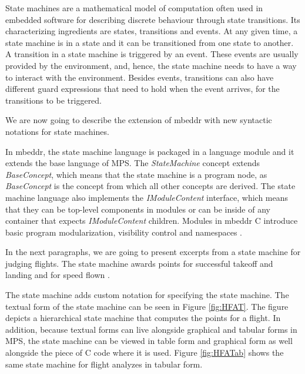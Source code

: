\documentclass[preprint,numbers,10pt]{sigplanconf}
\begin{document}
State machines are a mathematical model of computation often used in embedded software
for describing discrete behaviour through state transitions. Its characterizing
ingredients are states, transitions and events. At any given time, a state
machine is in a state and it can be transitioned from one state to another.
A transition in a state machine is triggered by an event. These events
are usually provided by the environment, and, hence, the state machine
needs to have a way to interact with the environment. Besides events,
transitions can also have different guard expressions that need to hold when
the event arrives, for the transitions to be triggered.

We are now going to describe the extension of mbeddr with new syntactic notations for state machines.

In mbeddr, the state machine language is packaged in a language module and it
extends the base language of MPS. The \emph{StateMachine} concept extends
\emph{BaseConcept}, which means that the state machine is a program node,
as \emph{BaseConcept} is the concept from which all other concepts are derived.
The state machine language also implements the \emph{IModuleContent} interface,
which means that they can be top-level components in modules or can be inside of any
container that expects \emph{IModuleContent} children. Modules in mbeddr C
introduce basic program modularization, visibility control and namespaces \cite{voelter2013mbeddr}.

In the next paragraphs, we are going to present excerpts from a state machine for
judging flights. The state machine awards points for successful
takeoff and landing and for speed flown \cite{voelter2014generic}.

The state machine adds custom notation for specifying the state machine. The textual
form of the state machine can be seen in Figure \ref{fig:HFAT}. The figure depicts a hierarchical state machine
that computes the points for a flight.
In addition, because textual forms can live alongside graphical and tabular forms in MPS, 
the state machine can be viewed in table form and graphical form as well alongside the piece of C code
where it is used. Figure \ref{fig:HFATab} shows the same state machine for flight analyzes in tabular form.
\end{document}
